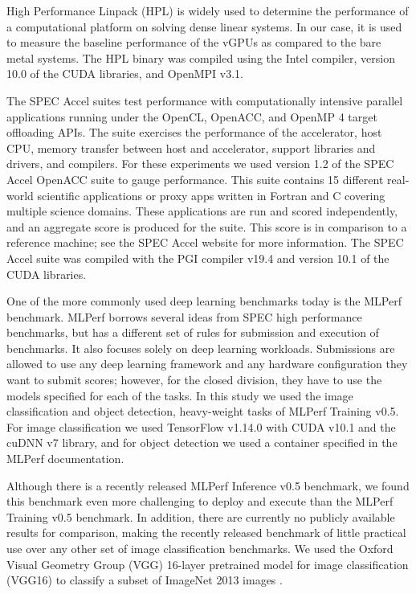 \documentclass[conference]{IEEEtran}
\begin{document}
High Performance Linpack (HPL) \cite{HPL} is widely used to determine the performance of a computational platform on solving dense linear systems. In our case, it is used to measure the baseline performance of the vGPUs as compared to the bare metal systems. The HPL binary was compiled using the Intel compiler, version 10.0 of the CUDA libraries, and OpenMPI v3.1.   

The SPEC Accel suites\cite{specaccel} test performance with computationally intensive parallel applications running under the OpenCL, OpenACC, and OpenMP 4 target offloading APIs. The suite exercises the performance of the accelerator, host CPU, memory transfer between host and accelerator, support libraries and drivers, and compilers. For these experiments we used version 1.2 of the SPEC Accel OpenACC suite to gauge performance. This suite contains 15 different real-world scientific applications or proxy apps written in Fortran and C covering multiple science domains. These applications are run and scored independently, and an aggregate score is produced for the suite. This score is in comparison to a reference machine; see the SPEC Accel website \cite{specweb} for more information. The SPEC Accel suite was compiled with the PGI compiler v19.4 and version 10.1 of the CUDA libraries.

One of the more commonly used deep learning benchmarks today is the MLPerf benchmark. MLPerf borrows several ideas from SPEC high performance benchmarks, but has a different set of rules for submission and execution of benchmarks. It also focuses solely on deep learning workloads. Submissions are allowed to use any deep learning framework and any hardware configuration they want to submit scores; however, for the closed division, they have to use the models specified for each of the tasks. In this study we used the image classification and object detection, heavy-weight tasks of MLPerf Training v0.5. For image classification we used TensorFlow v1.14.0 with CUDA v10.1 and the cuDNN v7 library, and for object detection we used a container specified in the MLPerf documentation.

Although there is a recently released MLPerf Inference v0.5 benchmark, we found this benchmark even more challenging to deploy and execute than the MLPerf Training v0.5 benchmark. In addition, there are currently no publicly available results for comparison, making the recently released benchmark of little practical use over any other set of image classification benchmarks. We used the Oxford Visual Geometry Group (VGG) 16-layer pretrained model for image classification (VGG16) \cite{classify-vgg} to classify a subset of ImageNet 2013 images \cite{classify-data}.
\end{document}
